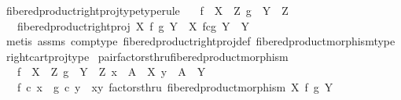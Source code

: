 \begin{isabellebody}
\isanewline
{}\isamarkupfalse%
\ fibered{\isacharunderscore}{\kern0pt}product{\isacharunderscore}{\kern0pt}right{\isacharunderscore}{\kern0pt}proj{\isacharunderscore}{\kern0pt}type{\isacharbrackleft}{\kern0pt}type{\isacharunderscore}{\kern0pt}rule{\isacharbrackright}{\kern0pt}{\isacharcolon}{\kern0pt}\isanewline
\ \ \ {\isachardoublequoteopen}f\ {\isacharcolon}{\kern0pt}\ X\ {\isasymrightarrow}\ Z{\isachardoublequoteclose}\ {\isachardoublequoteopen}g\ {\isacharcolon}{\kern0pt}\ Y\ {\isasymrightarrow}\ Z{\isachardoublequoteclose}\isanewline
\ \ \ {\isachardoublequoteopen}fibered{\isacharunderscore}{\kern0pt}product{\isacharunderscore}{\kern0pt}right{\isacharunderscore}{\kern0pt}proj\ X\ f\ g\ Y\ {\isacharcolon}{\kern0pt}\ X\ \isactrlbsub f\isactrlesub {\isasymtimes}\isactrlsub c\isactrlbsub g\isactrlesub \ Y\ {\isasymrightarrow}\ Y{\isachardoublequoteclose}\isanewline
%
\isadelimproof
\ \ %
\endisadelimproof
%
\isatagproof
{}\isamarkupfalse%
\ {\isacharparenleft}{\kern0pt}metis\ assms\ comp{\isacharunderscore}{\kern0pt}type\ fibered{\isacharunderscore}{\kern0pt}product{\isacharunderscore}{\kern0pt}right{\isacharunderscore}{\kern0pt}proj{\isacharunderscore}{\kern0pt}def\ fibered{\isacharunderscore}{\kern0pt}product{\isacharunderscore}{\kern0pt}morphism{\isacharunderscore}{\kern0pt}type\ right{\isacharunderscore}{\kern0pt}cart{\isacharunderscore}{\kern0pt}proj{\isacharunderscore}{\kern0pt}type{\isacharparenright}{\kern0pt}%
\endisatagproof
{\isafoldproof}%
%
\isadelimproof
\isanewline
%
\endisadelimproof
\isanewline
{}\isamarkupfalse%
\ pair{\isacharunderscore}{\kern0pt}factorsthru{\isacharunderscore}{\kern0pt}fibered{\isacharunderscore}{\kern0pt}product{\isacharunderscore}{\kern0pt}morphism{\isacharcolon}{\kern0pt}\isanewline
\ \ \ {\isachardoublequoteopen}f\ {\isacharcolon}{\kern0pt}\ X\ {\isasymrightarrow}\ Z{\isachardoublequoteclose}\ {\isachardoublequoteopen}g\ {\isacharcolon}{\kern0pt}\ Y\ {\isasymrightarrow}\ Z{\isachardoublequoteclose}\ {\isachardoublequoteopen}x\ {\isacharcolon}{\kern0pt}\ A\ {\isasymrightarrow}\ X{\isachardoublequoteclose}\ {\isachardoublequoteopen}y\ {\isacharcolon}{\kern0pt}\ A\ {\isasymrightarrow}\ Y{\isachardoublequoteclose}\isanewline
\ \ \ {\isachardoublequoteopen}f\ {\isasymcirc}\isactrlsub c\ x\ {\isacharequal}{\kern0pt}\ g\ {\isasymcirc}\isactrlsub c\ y\ {\isasymLongrightarrow}\ {\isasymlangle}x{\isacharcomma}{\kern0pt}y{\isasymrangle}\ factorsthru\ fibered{\isacharunderscore}{\kern0pt}product{\isacharunderscore}{\kern0pt}morphism\ X\ f\ g\ Y{\isachardoublequoteclose}\isanewline

\end{isabellebody}

